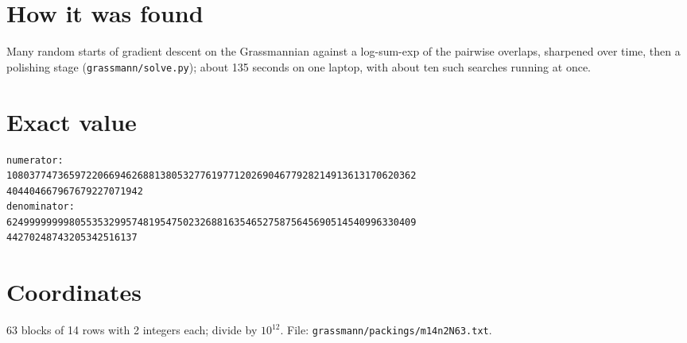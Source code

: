 \documentclass[11pt,a4paper]{article}
\begin{document}
\section{How it was found}
Many random starts of gradient descent on the Grassmannian against a log-sum-exp of the pairwise overlaps, sharpened over time, then a polishing stage (\texttt{grassmann/solve.py}); about 135 seconds on one laptop, with about ten such searches running at once.


\appendix
\section{Exact value}
{\small
\begin{verbatim}
numerator:
108037747365972206694626881380532776197712026904677928214913613170620362
404404667967679227071942
denominator:
624999999998055353299574819547502326881635465275875645690514540996330409
44270248743205342516137
\end{verbatim}}

\section{Coordinates}
63 blocks of 14 rows with 2 integers each; divide by $10^{12}$. File: \texttt{grassmann/packings/m14n2N63.txt}.
{\tiny
\begin{multicols}{4}
\end{multicols}}
\end{document}
